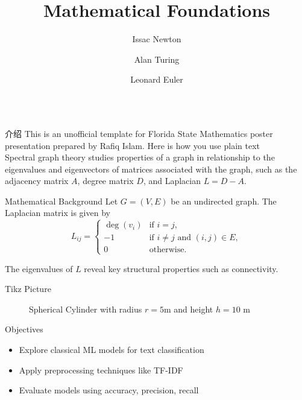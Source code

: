 \documentclass{beamer}
\title{Mathematical Foundations }
\author{Issac Newton \inst{1} \and Alan Turing \inst{1} \and Leonard Euler \inst{2}}
\institute[shortinst]{\inst{1} University of Cambridge \qquad \inst{2} University of Basel}
\newlength{\colwidth}
\begin{document}
\begin{frame}[t]
\begin{columns}[t]

\begin{column}{\colwidth}
\begin{block}{介绍}
This is an unofficial template for Florida State Mathematics poster presentation prepared by Rafiq Islam\cite{bnumathposter25}. Here is how you use plain text\hfill\\
Spectral graph theory studies properties of a graph in relationship to the eigenvalues and eigenvectors of matrices associated with the graph, such as the adjacency matrix $A$, degree matrix $D$, and Laplacian $L = D - A$.
\end{block}

\begin{block}{Mathematical Background}
    Let $G = (V, E)$ be an undirected graph. The Laplacian matrix is given by
        \[
        L_{ij} =
        \begin{cases}
        \deg(v_i) & \text{if } i = j, \\
        -1 & \text{if } i \neq j \text{ and } (i,j) \in E, \\
        0 & \text{otherwise}.
        \end{cases}
        \]

        The eigenvalues of $L$ reveal key structural properties such as connectivity.
\end{block}

\begin{block}{Tikz Picture}
    \begin{figure}
        \centering
        \caption{Spherical Cylinder with radius $r=5$m and height $h=10$ m}
        \label{fig:fig1}
    \end{figure}
\end{block}

\begin{block}{Objectives}
\begin{itemize}
  \item Explore classical ML models for text classification
  \item Apply preprocessing techniques like TF-IDF
  \item Evaluate models using accuracy, precision, recall
\end{itemize}
\end{block}


\end{column}
\end{columns}
\end{frame}
\end{document}

